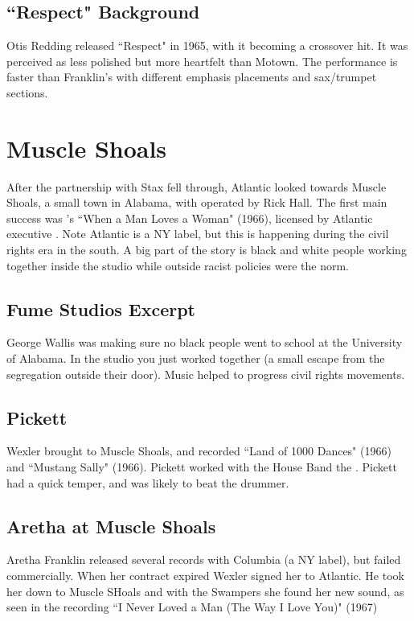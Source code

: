 \documentclass[12pt, a4paper, twoside, openright, titlepage]{book}
\begin{document}
\subsection{``Respect" Background}

Otis Redding released ``Respect" in 1965, with it becoming a crossover hit. It was perceived as less polished but more heartfelt than Motown. The performance is faster than Franklin's with different emphasis placements and sax/trumpet sections.


\section{Muscle Shoals}

After the partnership with Stax fell through, Atlantic looked towards Muscle Shoals, a small town in Alabama, with  operated by Rick Hall. The first main success was 's ``When a Man Loves a Woman" (1966), licensed by Atlantic executive . Note Atlantic is a NY label, but this is happening during the civil rights era in the south. A big part of the story is black and white people working together inside the studio while outside racist policies were the norm.

\subsection{Fume Studios Excerpt}

George Wallis was making sure no black people went to school at the University of Alabama. In the studio you just worked together (a small escape from the segregation outside their door). Music helped to progress civil rights movements.


\subsection{Pickett}

Wexler brought  to Muscle Shoals, and recorded ``Land of 1000 Dances" (1966) and ``Mustang Sally" (1966). Pickett worked with the House Band the . Pickett had a quick temper, and was likely to beat the drummer.


\subsection{Aretha at Muscle Shoals}

Aretha Franklin released several records with Columbia (a NY label), but failed commercially. When her contract expired Wexler signed her to Atlantic. He took her down to Muscle SHoals and with the Swampers she found her new sound, as seen in the recording ``I Never Loved a Man (The Way I Love You)" (1967)
\end{document}
